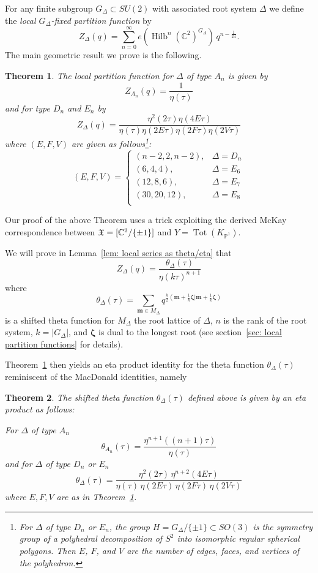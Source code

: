 \documentclass{article}
\newtheorem{theorem}{Theorem}[section]
\theoremstyle{definition}
\newcommand{\CC} {{\mathbb C}}          %
\newcommand{\PP}{\mathbb{P}}
\newcommand{\X}{\frak{X}}
\newcommand{\mvec}{\bm{m}}
\newcommand{\zetavec}{\bm{\zeta }}
\newcommand{\Hilb}{\operatorname{Hilb}}
\begin{document}
For any finite subgroup $G_{\Delta}\subset SU(2)$ with associated root
system $\Delta$ we define the \emph{local $G_{\Delta }$-fixed
partition function} by
\[
Z_{\Delta} (q) = \sum_{n=0}^{\infty}
e\left(\Hilb^{n}(\CC^{2})^{G_{\Delta}} \right) \, q^{n-\frac{1}{24}} .
\]
The main geometric result we prove is the following. 
\begin{theorem}\label{thm: formula for local series (in intro)}
The local partition function for $\Delta$ of type $A_{n}$ is given by 
\[
Z_{A_{n}}(q) = \frac{1}{\eta (\tau )}
\]
and for type $D_{n}$ and $E_{n}$ by
\[
Z_{\Delta}(q) = \frac{\eta^{2}(2\tau )\eta (4E\tau )}{\eta (\tau )\eta (2E\tau )\eta (2F\tau )\eta (2V\tau )}
\]
where $(E,F,V)$ are given as follows\footnote{For $\Delta$ of type
$D_{n}$ or $E_{n}$, the group $H = G_{\Delta}/\{\pm 1 \}\subset SO(3)$
is the symmetry group of a polyhedral decomposition of $S^{2}$ into
isomorphic regular spherical polygons. Then $E$, $F$, and $V$ are the
number of edges, faces, and vertices of the polyhedron.}:
\[
(E,F,V) = \begin{cases}
(n-2,2,n-2), & \Delta =D_{n}\\
(6,4,4), & \Delta =E_{6}\\
(12,8,6), & \Delta =E_{7}\\
(30,20,12), & \Delta =E_{8}\\
\end{cases}
\]
\end{theorem}
Our proof of the above Theorem uses a trick exploiting the derived
McKay correspondence between $\X =[\CC^{2}/\{\pm 1 \}]$ and
$Y=\operatorname{Tot}(K_{\PP^{1}})$.




We will prove in Lemma~\ref{lem: local series as theta/eta}  that
\[
Z_{\Delta}(q) =\frac{\theta_{\Delta}(\tau)}{\eta (k\tau )^{n+1}}
\]
where 
\[
\theta_{\Delta}(\tau ) = \sum_{\mvec \in M_{\Delta}}
q^{\frac{k}{2}\left(\mvec +\frac{1}{k}\zetavec |\mvec
+\frac{1}{k}\zetavec \right)}
\]
is a shifted theta function for $M_{\Delta} $ the root lattice of
$\Delta$, $n$ is the rank of the root system, $k=|G_{\Delta}|$, and
$\zetavec$ is dual to the longest root (see section~\ref{sec: local
partition functions} for details).

Theorem~\ref{thm: formula for local series (in intro)} then yields an
eta product identity for the theta function $\theta_{\Delta}(\tau )$
reminiscent of the MacDonald identities, namely
\begin{theorem}\label{thm: eta product for theta function}
The shifted theta function $\theta _{\Delta}(\tau )$ defined above is
given by an eta product as follows:

For $\Delta$ of type $A_{n}$
\[
\theta_{A_{n}} (\tau ) = \frac{\eta^{n+1} ((n+1)\tau )}{\eta (\tau )}
\]
and for $\Delta$ of type $D_{n}$ or $E_{n}$ 
\[
\theta_{\Delta}(\tau ) = \frac{\eta^{2}(2\tau )\,\eta ^{n+2}(4E\tau
)}{\eta (\tau )\, \eta (2E\tau )\,\eta (2F\tau )\,\eta (2V\tau )}
\]
where $E,F,V$ are as in Theorem~\ref{thm: formula for local series (in intro)}.
\end{theorem}
\end{document}
